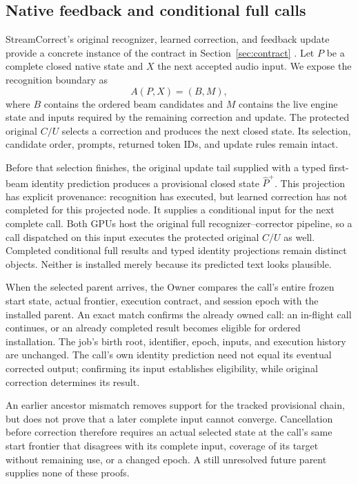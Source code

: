 \subsection{Native feedback and conditional full calls}
\label{subsec:native_full_calls}
StreamCorrect's original recognizer, learned correction, and feedback update
provide a concrete instance of the contract in Section~\ref{sec:contract}
\cite{vu2026streamcorrect}. Let $P$ be a complete closed native state and
$X$ the next accepted audio input. We expose the recognition boundary as
\begin{equation}
  A(P,X)=(B,M),
\end{equation}
where $B$ contains the ordered beam candidates and $M$ contains the live
engine state and inputs required by the remaining correction and update.
The protected original $C/U$ selects a correction and produces the next
closed state. Its selection, candidate order, prompts, returned token IDs,
and update rules remain intact.

Before that selection finishes, the original update tail supplied with a
typed first-beam identity prediction produces a provisional closed state
$\widehat P^+$. This projection has explicit provenance: recognition has
executed, but learned correction has not completed for this projected node.
It supplies a conditional input for the next complete call. Both GPUs host
the original full recognizer--corrector pipeline, so a call dispatched on
this input executes the protected original $C/U$ as well. Completed
conditional full results and typed identity projections remain distinct
objects. Neither is installed merely because its predicted text looks
plausible.

When the selected parent arrives, the Owner compares the call's entire
frozen start state, actual frontier, execution contract, and session epoch
with the installed parent. An exact match confirms the already owned call:
an in-flight call continues, or an already completed result becomes eligible
for ordered installation. The job's birth root, identifier, epoch, inputs,
and execution history are unchanged. The call's own identity prediction need
not equal its eventual corrected output; confirming its input establishes
eligibility, while original correction determines its result.

An earlier ancestor mismatch removes support for the tracked provisional
chain, but does not prove that a later complete input cannot converge.
Cancellation before correction therefore requires an actual selected state
at the call's same start frontier that disagrees with its complete input,
coverage of its target without remaining use, or a changed epoch. A still
unresolved future parent supplies none of these proofs.

